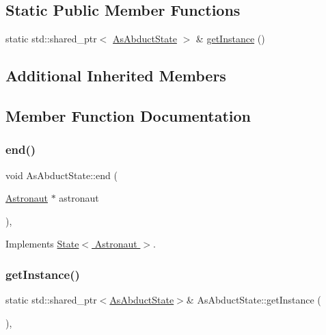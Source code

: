 \subsection*{Static Public Member Functions}
\begin{DoxyCompactItemize}
\item 
static std\+::shared\+\_\+ptr$<$ \hyperlink{class_as_abduct_state}{As\+Abduct\+State} $>$ \& \hyperlink{class_as_abduct_state_af2adec6fb71805d6a0fa2818c6c82e7d}{get\+Instance} ()
\end{DoxyCompactItemize}
\subsection*{Additional Inherited Members}


\subsection{Member Function Documentation}
\mbox{\label{class_as_abduct_state_a28ceb4aad2ec8dc1c07c584cf9f9778f}} 
\subsubsection{\texorpdfstring{end()}{end()}}
{\footnotesize\ttfamily void As\+Abduct\+State\+::end (\begin{DoxyParamCaption}\item[{\hyperlink{class_astronaut}{Astronaut} $\ast$}]{astronaut }\end{DoxyParamCaption})\hspace{0.3cm}{\ttfamily [override]}, {\ttfamily [virtual]}}



Implements \hyperlink{class_state_a97d058722f988c008e912a0e5ec879b3}{State$<$ Astronaut $>$}.

\mbox{\label{class_as_abduct_state_af2adec6fb71805d6a0fa2818c6c82e7d}} 
\subsubsection{\texorpdfstring{get\+Instance()}{getInstance()}}
{\footnotesize\ttfamily static std\+::shared\+\_\+ptr$<$\hyperlink{class_as_abduct_state}{As\+Abduct\+State}$>$\& As\+Abduct\+State\+::get\+Instance (\begin{DoxyParamCaption}{ }\end{DoxyParamCaption})\hspace{0.3cm}{\ttfamily [inline]}, {\ttfamily [static]}}

